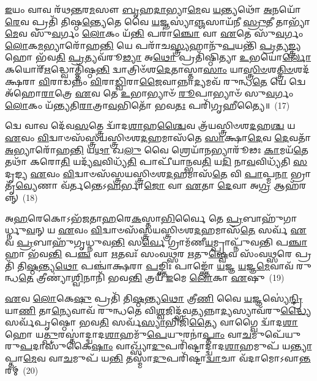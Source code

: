\-\ul{𑌇}\-𑌯𑌂 𑌵𑌾𑌵 𑌰᳴𑌥\-\ul{𑌨𑍍𑌤}\-𑌰\-\ul{𑌮}\-𑌸𑍗 \ul{𑌬𑍃}\-𑌹\-\ul{𑌦𑌾}\-𑌭𑍍𑌯𑌾\-\ul{𑌮𑍇}\-𑌵 \ul{𑌯}\-𑌨𑍍𑌤𑍍𑌯𑌥𑍋᳴ \ul{𑌅}\-𑌨𑌯𑍋᳴\-\ul{𑌰𑍇}\-𑌵 𑌪𑍍𑌰𑌤𑌿᳴ 𑌤𑌿𑌷𑍍𑌠\-\ul{𑌨𑍍𑌤𑍍𑌯𑍇}\-𑌤𑍇 𑌵𑍈 \ul{𑌯}\-𑌜𑍍𑌞𑌸𑍍𑌯𑌾॑\-\ul{𑌞𑍍𑌜}\-𑌸𑌾𑌯᳴𑌨𑍀 \ul{𑌸𑍍𑌰𑍁}\-𑌤𑍀 𑌤𑌾𑌭𑍍𑌯𑌾᳴\-\ul{𑌮𑍇}\-𑌵 𑌸𑍁᳴\-\ul{𑌵}\-𑌰𑍍𑌗𑌂 \ul{𑌲𑍋}\-𑌕𑌂 𑌯᳴\-\ul{𑌨𑍍𑌤𑌿} 𑌪𑌰𑌾॑\-\ul{𑌞𑍍𑌚𑍋} 𑌵𑌾 \ul{𑌏}\-𑌤𑍇 𑌸𑍁᳴\-\ul{𑌵}\-𑌰𑍍𑌗𑌂 \ul{𑌲𑍋}\-𑌕\-\ul{𑌮}\-𑌭𑍍𑌯𑌾𑌰𑍋᳴𑌹\-\ul{𑌨𑍍𑌤𑌿} 𑌯𑍇 𑌪𑌰𑌾᳴𑌚\-\ul{𑌸𑍍𑌤𑍍𑌰𑍍𑌯}\-𑌹𑌾𑌨𑍁᳴\-\ul{𑌪}\-𑌯𑌨𑍍𑌤𑌿᳴ \ul{𑌪𑍍𑌰}\-𑌤𑍍𑌯\-\ul{𑌙𑍍𑌤𑍍𑌰𑍍𑌯}\-𑌹𑍋 𑌭᳴𑌵\-\ul{𑌤𑌿} \ul{𑌪𑍍𑌰}\-𑌤𑍍𑌯𑌵᳴𑌰𑍂\-\ul{𑌢𑍍𑌯𑌾} 𑌅\-\ul{𑌥𑍋} 𑌪𑍍𑌰𑌤𑌿᳴𑌷𑍍𑌠𑌿𑌤𑍍𑌯𑌾 \ul{𑌉}\-𑌭𑌯𑍋॑\-\ul{𑌰𑍍𑌲𑍋}\-𑌕𑌯𑍋𑌰𑍍\mbox{}᳴\-\ul{𑌋}\-𑌦𑍍𑌧𑍍𑌵𑍋𑌤𑍍𑌤𑌿᳴𑌷𑍍𑌠\-\ul{𑌨𑍍𑌤𑌿} 𑌦𑍍𑌵𑌾𑌤𑍍𑌰𑌿𑍞᳴𑌶\-\ul{𑌦𑍇}\-𑌤𑌾𑌸𑍍𑌤𑌾\-\ul{𑌸𑌾𑌂} 𑌯𑌾\-\ul{𑌸𑍍𑌤𑍍𑌰𑌿}\-\-\ul{𑍞}\-𑌶\-\ul{𑌤𑍍𑌤𑍍𑌰𑌿}\-\-\ul{𑍞}\-𑌶𑌦᳴𑌕𑍍𑌷𑌰𑌾 \ul{𑌵𑌿}\-𑌰𑌾𑌡𑌨𑍍𑌨𑌂᳴ \ul{𑌵𑌿}\-𑌰𑌾\-\ul{𑌡𑍍𑌵𑌿}\-𑌰𑌾\-\ul{𑌜𑍈}\-𑌵𑌾𑌨𑍍𑌨𑌾\-\ul{𑌦𑍍𑌯}\-𑌮𑌵᳴ 𑌰𑍁𑌨𑍍𑌧\-\ul{𑌤𑍇} 𑌯𑍇 𑌦𑍍𑌵𑍇 𑌅᳴𑌹𑍋\-\ul{𑌰𑌾}\-𑌤𑍍𑌰𑍇 \ul{𑌏}\-𑌵 𑌤𑍇 \ul{𑌉}\-𑌭𑌾𑌭𑍍𑌯𑌾𑍞᳴ \ul{𑌰𑍂}\-𑌪𑌾𑌭𑍍𑌯𑌾𑍞᳴ 𑌸𑍁\-\ul{𑌵}\-𑌰𑍍𑌗𑌂 \ul{𑌲𑍋}\-𑌕𑌂 𑌯᳴𑌨𑍍𑌤𑍍𑌯𑌤𑌿\-\ul{𑌰𑌾}\-𑌤𑍍𑌰𑌾\-\ul{𑌵}\-𑌭𑌿𑌤𑍋᳴ 𑌭𑌵\-\ul{𑌤𑌃} 𑌪𑌰𑌿᳴𑌗𑍃𑌹𑍀𑌤𑍍𑌯𑍈॥~(17)

{\anuvakamend[{\-\ul{𑌗}\-\-\ul{𑌚𑍍𑌛}\-\-\ul{𑌨𑍍𑌤𑌿} \ul{𑌯}\-\-\ul{𑌨𑍍𑌤𑌿} \ul{𑌤𑍍𑌰𑌿}\-\-\ul{𑍞}\-𑌶𑌦᳴𑌕𑍍𑌷\-\ul{𑌰𑌾} 𑌦𑍍𑌵𑌾𑌵𑌿𑍞᳴𑌶𑌤𑌿𑌶𑍍𑌚}]}%

𑌦𑍍𑌵𑍇 𑌵𑌾𑌵 𑌦𑍇᳴𑌵\-\ul{𑌸}\-𑌤𑍍𑌤𑍍𑌰𑍇 𑌦𑍍𑌵𑌾᳴𑌦\-\ul{𑌶𑌾}\-𑌹\-\ul{𑌶𑍍𑌚𑍈}\-𑌵 𑌤𑍍𑌰᳴𑌯𑌸𑍍𑌤𑍍𑌰𑌿𑍞𑌶\-\ul{𑌦}\-𑌹\-\ul{𑌶𑍍𑌚} 𑌯 \ul{𑌏}\-𑌵𑌂 \ul{𑌵𑌿}\-𑌦𑍍𑌵𑌾𑍞𑌸᳴𑌸𑍍𑌤𑍍𑌰𑌯𑌸𑍍𑌤𑍍𑌰𑌿𑍞𑌶\-\ul{𑌦}\-𑌹𑌮𑌾𑌸᳴𑌤𑍇 \ul{𑌸𑌾}\-𑌕𑍍𑌷𑌾\-\ul{𑌦𑍇}\-𑌵 \ul{𑌦𑍇}\-𑌵𑌤𑌾᳴ \ul{𑌅}\-𑌭𑍍𑌯𑌾𑌰𑍋᳴𑌹\-\ul{𑌨𑍍𑌤𑌿} 𑌯\-\ul{𑌥𑌾} 𑌖\-\ul{𑌲𑍁} 𑌵𑍈 𑌶𑍍𑌰𑍇𑌯𑌾᳴\-\ul{𑌨}\-𑌭𑍍𑌯𑌾𑌰𑍂᳴𑌢𑌃 \ul{𑌕𑌾}\-𑌮𑌯᳴\-\ul{𑌤𑍇} 𑌤𑌥𑌾᳴ 𑌕𑌰𑍋\-\ul{𑌤𑌿} 𑌯𑌦𑍍𑌯᳴\-\ul{𑌵}\-𑌵𑌿𑌧𑍍𑌯᳴\-\ul{𑌤𑌿} 𑌪𑌾𑌪𑍀᳴𑌯𑌾𑌨𑍍𑌭𑌵\-\ul{𑌤𑌿} 𑌯\-\ul{𑌦𑌿} 𑌨𑌾\-\ul{𑌵}\-𑌵𑌿𑌧𑍍𑌯᳴𑌤𑌿 \ul{𑌸}\-𑌦𑍃𑌙𑍍𑌯 \ul{𑌏}\-𑌵𑌂 \ul{𑌵𑌿}\-𑌦𑍍𑌵𑌾𑍞𑌸᳴𑌸𑍍𑌤𑍍𑌰𑌯𑌸𑍍𑌤𑍍𑌰𑌿𑍞𑌶\-\ul{𑌦}\-𑌹𑌮𑌾𑌸᳴\-\ul{𑌤𑍇} 𑌵𑌿 \ul{𑌪𑌾}\-𑌪𑍍𑌮\-\ul{𑌨𑌾} 𑌭𑍍𑌰𑌾𑌤𑍃᳴\-\ul{𑌵𑍍𑌯𑍇}\-𑌣𑌾 𑌵᳴𑌰𑍍𑌤𑌨𑍍𑌤𑍇\-𑌽\-\ul{𑌹}\-𑌰𑍍𑌭𑌾\-\ul{𑌜𑍋} 𑌵𑌾 \ul{𑌏}\-𑌤𑌾 \ul{𑌦𑍇}\-𑌵𑌾 𑌅\-\ul{𑌗𑍍𑌰} 𑌆𑌹᳴𑌰𑌨𑍍𑌨𑍍~(18)

𑌅\-\ul{𑌹}\-𑌰𑍇𑌕𑍋\-𑌽𑌭᳴\-\ul{𑌜}\-𑌤𑌾\-\ul{𑌹}\-𑌰𑍇\-\ul{𑌕}\-𑌸𑍍𑌤𑌾\-\ul{𑌭𑌿}\-𑌰𑍍𑌵𑍈 𑌤𑍇 \ul{𑌪𑍍𑌰}\-𑌬𑌾𑌹𑍁᳴𑌗𑌾𑌰𑍍𑌧𑍍𑌨𑍁\-\ul{𑌵}\-𑌨𑍍 𑌯 \ul{𑌏}\-𑌵𑌂 \ul{𑌵𑌿}\-𑌦𑍍𑌵𑌾𑍞𑌸᳴𑌸𑍍𑌤𑍍𑌰𑌯𑌸𑍍𑌤𑍍𑌰𑌿𑍞𑌶\-\ul{𑌦}\-𑌹𑌮𑌾𑌸᳴\-\ul{𑌤𑍇} 𑌸𑌰𑍍𑌵᳴ \ul{𑌏}\-𑌵 \ul{𑌪𑍍𑌰}\-𑌬𑌾𑌹𑍁᳴𑌗𑍃𑌧𑍍𑌨𑍁𑌵\-\ul{𑌨𑍍𑌤𑌿} 𑌸\-\ul{𑌰𑍍𑌵𑍇} 𑌗𑍍𑌰𑌾𑌮᳴𑌣𑍀\-\ul{𑌯}\-𑌮𑍍𑌪𑍍𑌰𑌾𑌪𑍍𑌨𑍁᳴𑌵𑌨𑍍𑌤𑌿 𑌪\-\ul{𑌞𑍍𑌚𑌾}\-𑌹𑌾 𑌭᳴𑌵\-\ul{𑌨𑍍𑌤𑌿} 𑌪\-\ul{𑌞𑍍𑌚} 𑌵𑌾 \ul{𑌋}\-𑌤𑌵𑌃᳴ 𑌸𑌂𑌵\-\ul{𑌥𑍍𑌸}\-𑌰 \ul{𑌋}\-𑌤𑍁\-\ul{𑌷𑍍𑌵𑍇}\-𑌵 𑌸𑌂᳴𑌵\-\ul{𑌥𑍍𑌸}\-𑌰𑍇 𑌪𑍍𑌰𑌤𑌿᳴ 𑌤𑌿\-\ul{𑌷𑍍𑌠}\-𑌨𑍍𑌤𑍍𑌯\-\ul{𑌥𑍋} 𑌪𑌞𑍍𑌚𑌾॑𑌕𑍍𑌷𑌰𑌾 \ul{𑌪}\-𑌙𑍍𑌕𑍍𑌤𑌿𑌃 𑌪𑌾𑌙𑍍𑌕𑍍𑌤𑍋᳴ \ul{𑌯}\-𑌜𑍍𑌞 \ul{𑌯}\-𑌜𑍍𑌞\-\ul{𑌮𑍇}\-𑌵𑌾𑌵᳴ 𑌰𑍁𑌨𑍍𑌧\-\ul{𑌤𑍇} 𑌤𑍍𑌰𑍀𑌣𑍍𑌯𑌾॑\-\ul{𑌶𑍍𑌵𑌿}\-𑌨𑌾𑌨𑌿᳴ 𑌭𑌵\-\ul{𑌨𑍍𑌤𑌿} 𑌤𑍍𑌰𑌯᳴ \ul{𑌇}\-𑌮𑍇 \ul{𑌲𑍋}\-𑌕𑌾 \ul{𑌏}\-𑌷𑍁~(19)

\-\ul{𑌏}\-𑌵 \ul{𑌲𑍋}\-𑌕𑍇\-\ul{𑌷𑍁} 𑌪𑍍𑌰𑌤𑌿᳴ 𑌤𑌿\-\ul{𑌷𑍍𑌠}\-𑌨𑍍𑌤𑍍𑌯\-\ul{𑌥𑍋} 𑌤𑍍𑌰𑍀\-\ul{𑌣𑌿} 𑌵𑍈 \ul{𑌯}\-𑌜𑍍𑌞𑌸𑍍𑌯𑍇॑\-\ul{𑌨𑍍𑌦𑍍𑌰𑌿}\-𑌯𑌾\-\ul{𑌣𑌿} 𑌤𑌾\-\ul{𑌨𑍍𑌯𑍇}\-𑌵𑌾𑌵᳴ 𑌰𑍁𑌨𑍍𑌧𑌤𑍇 𑌵𑌿\-\ul{𑌶𑍍𑌵}\-𑌜𑌿𑌦𑍍𑌭᳴𑌵\-\ul{𑌤𑍍𑌯}\-𑌨𑍍𑌨𑌾\-\ul{𑌦𑍍𑌯}\-𑌸𑍍𑌯𑌾𑌵᳴𑌰𑍁\-\ul{𑌦𑍍𑌧𑍍𑌯𑍈} 𑌸𑌰𑍍𑌵᳴𑌪𑍃𑌷𑍍𑌠𑍋 𑌭𑌵\-\ul{𑌤𑌿} 𑌸𑌰𑍍𑌵᳴\-\ul{𑌸𑍍𑌯𑌾}\-𑌭𑌿𑌜𑌿᳴\-\ul{𑌤𑍍𑌯𑍈} 𑌵𑌾𑌗𑍍𑌵𑍈 𑌦𑍍𑌵𑌾᳴𑌦\-\ul{𑌶𑌾}\-𑌹𑍋 𑌯\-\ul{𑌤𑍍𑌪𑍁}\-𑌰𑌸𑍍𑌤𑌾॑𑌦𑍍𑌦𑍍𑌵𑌾𑌦\-\ul{𑌶𑌾}\-𑌹𑌮𑍁᳴\-\ul{𑌪𑍇}\-𑌯𑍁𑌰𑌨𑌾॑\-\ul{𑌪𑍍𑌤𑌾𑌂} 𑌵𑌾\-\ul{𑌚}\-𑌮𑍁𑌪𑍇᳴𑌯𑍁𑌰𑍁\-\ul{𑌪}\-𑌦𑌾𑌸𑍁᳴𑌕𑍈\-\ul{𑌷𑌾𑌂} 𑌵𑌾𑌖𑍍𑌸𑍍𑌯𑌾᳴\-\ul{𑌦𑍁}\-𑌪𑌰𑌿᳴𑌷𑍍𑌟𑌾𑌦𑍍𑌦𑍍𑌵𑌾𑌦\-\ul{𑌶𑌾}\-𑌹𑌮𑍁𑌪᳴ 𑌯\-\ul{𑌨𑍍𑌤𑍍𑌯𑌾}\-𑌪𑍍𑌤𑌾\-\ul{𑌮𑍇}\-𑌵 𑌵𑌾\-\ul{𑌚}\-𑌮𑍁𑌪᳴ 𑌯\-\ul{𑌨𑍍𑌤𑌿} 𑌤𑌸𑍍𑌮𑌾᳴\-\ul{𑌦𑍁}\-𑌪𑌰𑌿᳴𑌷𑍍𑌟𑌾\-\ul{𑌦𑍍𑌵𑌾}\-𑌚𑌾 𑌵᳴𑌦𑌾𑌮𑍋\-𑌽𑌵𑌾\-\ul{𑌨𑍍𑌤}\-𑌰𑌮𑍍~(20)

